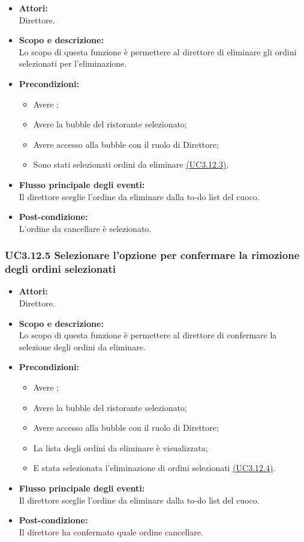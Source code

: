 \begin{itemize}
	\item \textbf{Attori:}
	\\Direttore.
	\item \textbf{Scopo e descrizione:} 
	\\Lo scopo di questa funzione è permettere al direttore di eliminare gli ordini selezionati per l’eliminazione.
	\item \textbf{Precondizioni:}
	\begin{itemize}
		\item Avere ;
		\item Avere la bubble del ristorante selezionato;
		\item Avere accesso alla bubble con il ruolo di Direttore;
		\item Sono stati selezionati ordini da eliminare \hyperref[UC3.12.3]{(UC3.12.3)}.
	\end{itemize}
	\item \textbf{Flusso principale degli eventi:}
	\\Il direttore sceglie l’ordine da eliminare dalla to-do list del cuoco.
	\item \textbf{Post-condizione:}
	\\L’ordine da cancellare è selezionato.
\end{itemize}

\subsubsection{UC3.12.5 Selezionare l’opzione per confermare la rimozione degli ordini selezionati} \label{UC3.12.5}

\begin{itemize}
	\item \textbf{Attori:}
	\\Direttore.
	\item \textbf{Scopo e descrizione:} 
	\\Lo scopo di questa funzione è permettere al direttore di confermare la selezione degli ordini da eliminare.
	\item \textbf{Precondizioni:}
	\begin{itemize}
		\item Avere ;
		\item Avere la bubble del ristorante selezionato;
		\item Avere accesso alla bubble con il ruolo di Direttore;
		\item La lista degli ordini da eliminare è visualizzata;
		\item E stata selezionata l’eliminazione di ordini selezionati \hyperref[UC3.12.4]{(UC3.12.4)}.
	\end{itemize}
	\item \textbf{Flusso principale degli eventi:}
	\\Il direttore sceglie l’ordine da eliminare dalla to-do list del cuoco.
	\item \textbf{Post-condizione:}
	\\Il direttore ha confermato quale ordine cancellare.
\end{itemize}

